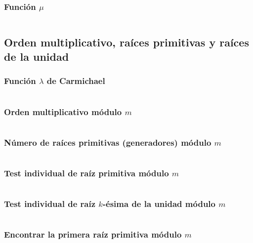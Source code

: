 \documentclass[11pt]{article}
\begin{document}
			\subsubsection{Función $\mu$}
			\inputminted[tabsize=2,breaklines,firstline=276,lastline=287,fontsize=\small]{c++}{numberTheory.cpp}
			
		\subsection{Orden multiplicativo, raíces primitivas y raíces de la unidad}
			\subsubsection{Función $\lambda$ de Carmichael}
			\inputminted[tabsize=2,breaklines,firstline=260,lastline=274,fontsize=\small]{c++}{numberTheory.cpp}
			
			\subsubsection{Orden multiplicativo módulo $m$}
			\inputminted[tabsize=2,breaklines,firstline=289,lastline=305,fontsize=\small]{c++}{numberTheory.cpp}
			
			\subsubsection{Número de raíces primitivas (generadores) módulo $m$}
			\inputminted[tabsize=2,breaklines,firstline=307,lastline=313,fontsize=\small]{c++}{numberTheory.cpp}
			
			\subsubsection{Test individual de raíz primitiva módulo $m$}
			\inputminted[tabsize=2,breaklines,firstline=315,lastline=325,fontsize=\small]{c++}{numberTheory.cpp}
			
			\subsubsection{Test individual de raíz $k$-ésima de la unidad módulo $m$}
			\inputminted[tabsize=2,breaklines,firstline=327,lastline=336,fontsize=\small]{c++}{numberTheory.cpp}
			
			\subsubsection{Encontrar la primera raíz primitiva módulo $m$}
			\inputminted[tabsize=2,breaklines,firstline=338,lastline=355,fontsize=\small]{c++}{numberTheory.cpp}
			
\end{document}

